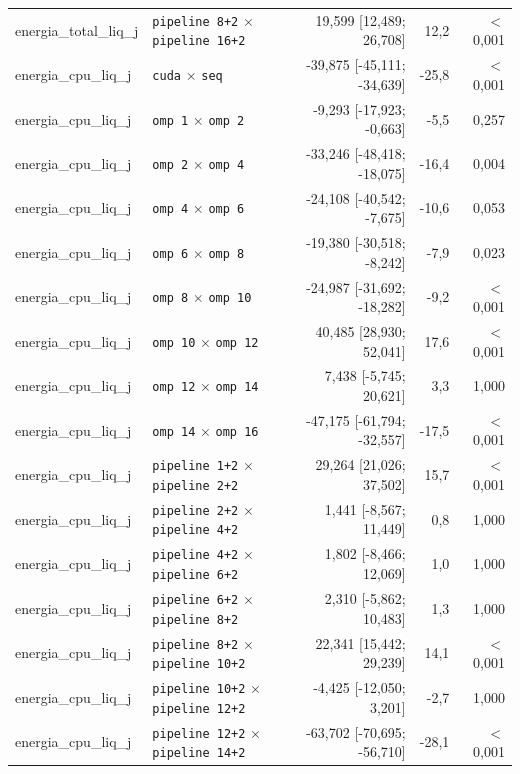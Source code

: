 \begin{tabular}{llrrr}
energia\_total\_liq\_j & \texttt{pipeline 8+2} $\times$ \texttt{pipeline 16+2} & 19,599 [12,489; 26,708] & 12,2 & $<$0,001 \\
energia\_cpu\_liq\_j & \texttt{cuda} $\times$ \texttt{seq} & -39,875 [-45,111; -34,639] & -25,8 & $<$0,001 \\
energia\_cpu\_liq\_j & \texttt{omp 1} $\times$ \texttt{omp 2} & -9,293 [-17,923; -0,663] & -5,5 & 0,257 \\
energia\_cpu\_liq\_j & \texttt{omp 2} $\times$ \texttt{omp 4} & -33,246 [-48,418; -18,075] & -16,4 & 0,004 \\
energia\_cpu\_liq\_j & \texttt{omp 4} $\times$ \texttt{omp 6} & -24,108 [-40,542; -7,675] & -10,6 & 0,053 \\
energia\_cpu\_liq\_j & \texttt{omp 6} $\times$ \texttt{omp 8} & -19,380 [-30,518; -8,242] & -7,9 & 0,023 \\
energia\_cpu\_liq\_j & \texttt{omp 8} $\times$ \texttt{omp 10} & -24,987 [-31,692; -18,282] & -9,2 & $<$0,001 \\
energia\_cpu\_liq\_j & \texttt{omp 10} $\times$ \texttt{omp 12} & 40,485 [28,930; 52,041] & 17,6 & $<$0,001 \\
energia\_cpu\_liq\_j & \texttt{omp 12} $\times$ \texttt{omp 14} & 7,438 [-5,745; 20,621] & 3,3 & 1,000 \\
energia\_cpu\_liq\_j & \texttt{omp 14} $\times$ \texttt{omp 16} & -47,175 [-61,794; -32,557] & -17,5 & $<$0,001 \\
energia\_cpu\_liq\_j & \texttt{pipeline 1+2} $\times$ \texttt{pipeline 2+2} & 29,264 [21,026; 37,502] & 15,7 & $<$0,001 \\
energia\_cpu\_liq\_j & \texttt{pipeline 2+2} $\times$ \texttt{pipeline 4+2} & 1,441 [-8,567; 11,449] & 0,8 & 1,000 \\
energia\_cpu\_liq\_j & \texttt{pipeline 4+2} $\times$ \texttt{pipeline 6+2} & 1,802 [-8,466; 12,069] & 1,0 & 1,000 \\
energia\_cpu\_liq\_j & \texttt{pipeline 6+2} $\times$ \texttt{pipeline 8+2} & 2,310 [-5,862; 10,483] & 1,3 & 1,000 \\
energia\_cpu\_liq\_j & \texttt{pipeline 8+2} $\times$ \texttt{pipeline 10+2} & 22,341 [15,442; 29,239] & 14,1 & $<$0,001 \\
energia\_cpu\_liq\_j & \texttt{pipeline 10+2} $\times$ \texttt{pipeline 12+2} & -4,425 [-12,050; 3,201] & -2,7 & 1,000 \\
energia\_cpu\_liq\_j & \texttt{pipeline 12+2} $\times$ \texttt{pipeline 14+2} & -63,702 [-70,695; -56,710] & -28,1 & $<$0,001 \\

\end{tabular}
